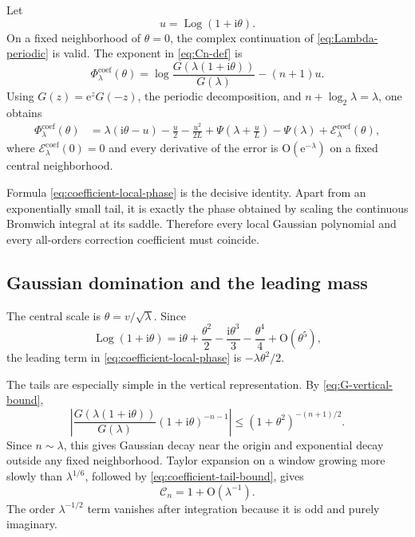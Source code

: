 \documentclass[11pt,oneside]{article}
\theoremstyle{definition}
\theoremstyle{remark}
\newcommand{\e}{\mathrm e}
\newcommand{\ii}{\mathrm i}
\newcommand{\bigO}{\mathrm O}
\newcommand{\CoeffMass}{\mathcal C}
\newcommand{\Log}{\operatorname{Log}}
\begin{document}
Let
\begin{equation}
 u=\Log(1+\ii\theta).
\label{eq:u-def}
\end{equation}
On a fixed neighborhood of $\theta=0$, the complex continuation of
\eqref{eq:Lambda-periodic} is valid.  The exponent in \eqref{eq:Cn-def} is
\begin{equation}
 \Phi^{\mathrm{coef}}_\lambda(\theta)=
 \log\frac{G(\lambda(1+\ii\theta))}{G(\lambda)}-(n+1)u.
\label{eq:coef-phase-def}
\end{equation}
Using $G(z)=\e^zG(-z)$, the periodic decomposition, and
$n+\log_2\lambda=\lambda$, one obtains
\begin{align}
 \Phi^{\mathrm{coef}}_\lambda(\theta)
 &=\lambda(\ii\theta-u)-\frac u2-\frac{u^2}{2L}
 +\Psi\!\left(\lambda+\frac uL\right)-\Psi(\lambda)
 +\mathcal E^{\mathrm{coef}}_\lambda(\theta),
\label{eq:coefficient-local-phase}
\end{align}
where $\mathcal E^{\mathrm{coef}}_\lambda(0)=0$ and every derivative of the error is
$\bigO(\e^{-\lambda})$ on a fixed central neighborhood.

Formula \eqref{eq:coefficient-local-phase} is the decisive identity.  Apart from an exponentially small tail, it is exactly the phase obtained by scaling the continuous Bromwich integral at its saddle.  Therefore every local Gaussian polynomial and every all-orders correction coefficient must coincide.

\subsection{Gaussian domination and the leading mass}

The central scale is $\theta=v/\sqrt\lambda$.  Since
\begin{equation}
 \Log(1+\ii\theta)=
 \ii\theta+\frac{\theta^2}{2}-\frac{\ii\theta^3}{3}
 -\frac{\theta^4}{4}+\bigO(\theta^5),
\label{eq:log-expansion}
\end{equation}
the leading term in \eqref{eq:coefficient-local-phase} is
$-\lambda\theta^2/2$.

The tails are especially simple in the vertical representation.  By
\eqref{eq:G-vertical-bound},
\begin{equation}
 \left|
 \frac{G(\lambda(1+\ii\theta))}{G(\lambda)}
 (1+\ii\theta)^{-n-1}
 \right|
 \le(1+\theta^2)^{-(n+1)/2}.
\label{eq:coefficient-tail-bound}
\end{equation}
Since $n\sim\lambda$, this gives Gaussian decay near the origin and exponential decay outside any fixed neighborhood.  Taylor expansion on a window growing more slowly than $\lambda^{1/6}$, followed by \eqref{eq:coefficient-tail-bound}, gives
\begin{equation}
 \CoeffMass_n=1+\bigO(\lambda^{-1}).
\label{eq:Cn-leading}
\end{equation}
The order $\lambda^{-1/2}$ term vanishes after integration because it is odd and purely imaginary.
\end{document}
